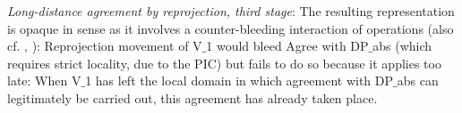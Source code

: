 \documentclass[output=paper
,modfonts
,nonflat]{langsci/langscibook}
\begin{document}
\ea\label{ex:mueller:34} {\itshape Long-distance agreement \label{Baum3}by reprojection, third stage}:
\z
The resulting representation is opaque in 
sense as it involves a counter-bleeding interaction of operations
(also cf.  \cite{Chomsky:51}, \citet[25--26]{Chomsky:75:the}):
Reprojection movement of V$\_$1 would bleed Agree with DP$\_${abs}
(which requires strict locality, due to the PIC) but fails to do so
because it applies too late: When V$\_$1 has left the local domain in
which agreement  with DP$\_${abs} can legitimately be carried out, this
agreement has already taken place. 
\end{document}
